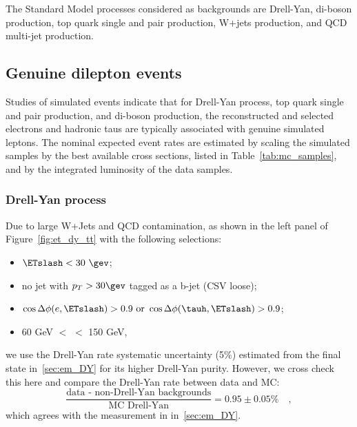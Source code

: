 The Standard Model processes considered as backgrounds are Drell-Yan,
di-boson production, top quark single and pair production, W+jets
production, and QCD multi-jet production.

\subsection{Genuine dilepton events}

Studies of simulated events indicate that for Drell-Yan process, top
quark single and pair production, and di-boson production, the
reconstructed and selected electrons and hadronic taus are typically
associated with genuine simulated leptons.  The nominal expected event
rates are estimated by scaling the simulated samples by the best
available cross sections, listed in Table~\ref{tab:mc_samples}, and by
the integrated luminosity of the data samples.

\subsubsection{Drell-Yan process}
Due to large W+Jets and QCD contamination, as shown in the left panel of 
Figure~\ref{fig:et_dy_tt} with the following selections:
\begin{itemize}
  \item $\ETslash<30~\gev$;
  \item no jet with $p_T>30\gev$ tagged as a b-jet (CSV loose);
  \item $\cos{\Delta \phi (e,\ETslash)} > 0.9~\text{or}~\cos{\Delta \phi (\tauh,\ETslash)} > 0.9$;
  \item 60 GeV $<$ \meffetau $<$ 150 GeV,
\end{itemize}
we use the Drell-Yan rate systematic uncertainty (5\%) estimated from
the \tetm final state in~\ref{sec:em_DY} for its higher Drell-Yan 
purity. However, we cross check this here and compare the Drell-Yan 
rate between data and MC:
\begin{equation}\label{eq:et_DY}
\frac{\text{data - non-Drell-Yan backgrounds}}{\text{MC Drell-Yan}} = 0.95 \pm 0.05\%\quad,
\end{equation}
which agrees with the measurement in in~\ref{sec:em_DY}. 


